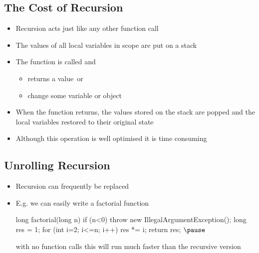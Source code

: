 
\begin{slide}
\section[-1]{The Cost of Recursion}

\begin{PauseHighLight}
  \begin{itemize}
  \item Recursion acts just like any other function call\pause
  \item The values of all local variables in scope are put on a stack\pause
  \item The function is called and\pause
    \begin{itemize}
    \item returns a value\pause\ or
    \item change some variable or object\pause
    \end{itemize}
  \item When the function returns, the values stored on the stack are
    popped and the local variables restored to their original state\pause
  \item Although this operation is well optimised it is time consuming\pause
  \end{itemize}
\end{PauseHighLight}

\end{slide}


\begin{slide}
\section{Unrolling Recursion}

\begin{PauseHighLight}
  \begin{itemize}
  \item Recursion can frequently be replaced\pause
  \item E.g. we can easily write a factorial function
    \begin{java}
    long factorial(long n)
    {
        if (n<0)
            throw new IllegalArgumentException();
        long res = 1;
        for (int i=2; i<=n; i++)
            res *= i;
        return res;
    }$\pause$
    \end{java}
    with no function calls this will run much faster than the recursive
    version\pause
  \end{itemize}
\end{PauseHighLight}
\end{slide}

